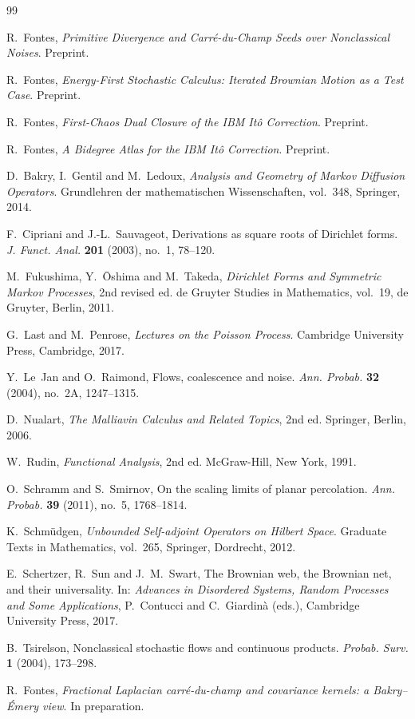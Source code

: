 \documentclass[11pt,reqno]{amsart}
\theoremstyle{plain}
\theoremstyle{definition}
\theoremstyle{remark}
\begin{document}
\begin{thebibliography}{99}

R.~Fontes,
\emph{Primitive Divergence and Carr\'e-du-Champ Seeds over Nonclassical Noises}.
Preprint.

R.~Fontes,
\emph{Energy-First Stochastic Calculus: Iterated Brownian Motion as a Test Case}.
Preprint.

R.~Fontes,
\emph{First-Chaos Dual Closure of the IBM It\^o Correction}.
Preprint.

R.~Fontes,
\emph{A Bidegree Atlas for the IBM It\^o Correction}.
Preprint.

D.~Bakry, I.~Gentil and M.~Ledoux,
\emph{Analysis and Geometry of Markov Diffusion Operators}.
Grundlehren der mathematischen Wissenschaften, vol.~348, Springer, 2014.

F.~Cipriani and J.-L.~Sauvageot,
Derivations as square roots of Dirichlet forms.
\emph{J. Funct. Anal.} \textbf{201} (2003), no.~1, 78--120.

M.~Fukushima, Y.~\=Oshima and M.~Takeda,
\emph{Dirichlet Forms and Symmetric Markov Processes}, 2nd revised ed.
de Gruyter Studies in Mathematics, vol.~19, de Gruyter, Berlin, 2011.

G.~Last and M.~Penrose,
\emph{Lectures on the Poisson Process}.
Cambridge University Press, Cambridge, 2017.

Y.~Le~Jan and O.~Raimond,
Flows, coalescence and noise.
\emph{Ann. Probab.} \textbf{32} (2004), no.~2A, 1247--1315.

D.~Nualart,
\emph{The Malliavin Calculus and Related Topics}, 2nd ed.
Springer, Berlin, 2006.

W.~Rudin,
\emph{Functional Analysis}, 2nd ed.
McGraw-Hill, New York, 1991.

O.~Schramm and S.~Smirnov,
On the scaling limits of planar percolation.
\emph{Ann. Probab.} \textbf{39} (2011), no.~5, 1768--1814.

K.~Schm\"udgen,
\emph{Unbounded Self-adjoint Operators on Hilbert Space}.
Graduate Texts in Mathematics, vol.~265, Springer, Dordrecht, 2012.

E.~Schertzer, R.~Sun and J.~M.~Swart,
The Brownian web, the Brownian net, and their universality.
In: \emph{Advances in Disordered Systems, Random Processes and Some Applications}, P.~Contucci and C.~Giardin\`a (eds.), Cambridge University Press, 2017.

B.~Tsirelson,
Nonclassical stochastic flows and continuous products.
\emph{Probab. Surv.} \textbf{1} (2004), 173--298.

R.~Fontes,
\emph{Fractional Laplacian carr\'e-du-champ and covariance kernels: a Bakry--\'Emery view}.
In preparation.

\end{thebibliography}
\end{document}
